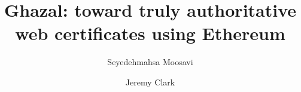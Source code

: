 \documentclass[envcountsect]{llncs}
\begin{document}
\frontmatter
\mainmatter

\title{\Large \bf Ghazal: toward truly authoritative web certificates using Ethereum}
\author{}

\author{Seyedehmahsa Moosavi \and Jeremy Clark}




\maketitle














\clearpage
\appendix
\end{document}
